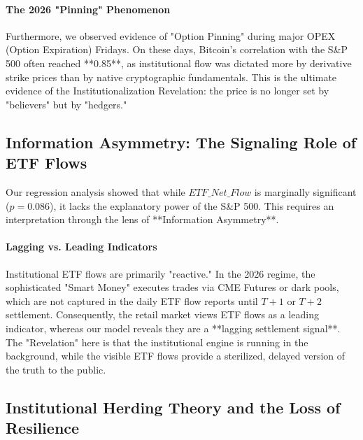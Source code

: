 \documentclass[10pt, conference, compsocconf]{IEEEtran}
\begin{document}
\paragraph{The 2026 "Pinning" Phenomenon}
Furthermore, we observed evidence of "Option Pinning" during major OPEX (Option Expiration) Fridays. On these days, Bitcoin's correlation with the S\&P 500 often reached **0.85**, as institutional flow was dictated more by derivative strike prices than by native cryptographic fundamentals. This is the ultimate evidence of the Institutionalization Revelation: the price is no longer set by "believers" but by "hedgers."


\subsection{Information Asymmetry: The Signaling Role of ETF Flows}

Our regression analysis showed that while $ETF\_Net\_Flow$ is marginally significant ($p = 0.086$), it lacks the explanatory power of the S\&P 500. This requires an interpretation through the lens of **Information Asymmetry**.

\paragraph{Lagging vs. Leading Indicators}
Institutional ETF flows are primarily "reactive." In the 2026 regime, the sophisticated "Smart Money" executes trades via CME Futures or dark pools, which are not captured in the daily ETF flow reports until $T+1$ or $T+2$ settlement. Consequently, the retail market views ETF flows as a leading indicator, whereas our model reveals they are a **lagging settlement signal**. The "Revelation" here is that the institutional engine is running in the background, while the visible ETF flows provide a sterilized, delayed version of the truth to the public.


\subsection{Institutional Herding Theory and the Loss of Resilience}
\end{document}

